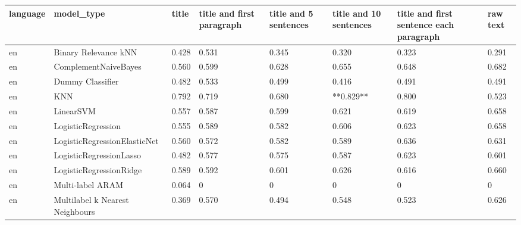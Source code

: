 \begin{tabular}{llllllll}
\toprule
language &                      model\_type & title & title and first paragraph & title and 5 sentences & title and 10 sentences & title and first sentence each paragraph &  raw text \\
\midrule
      en &            Binary Relevance kNN & 0.428 &                     0.531 &                 0.345 &                  0.320 &                                   0.323 &     0.291 \\
      en &            ComplementNaiveBayes & 0.560 &                     0.599 &                 0.628 &                  0.655 &                                   0.648 &     0.682 \\
      en &                Dummy Classifier & 0.482 &                     0.533 &                 0.499 &                  0.416 &                                   0.491 &     0.491 \\
      en &                             KNN & 0.792 &                     0.719 &                 0.680 &              **0.829** &                                   0.800 &     0.523 \\
      en &                       LinearSVM & 0.557 &                     0.587 &                 0.599 &                  0.621 &                                   0.619 &     0.658 \\
      en &              LogisticRegression & 0.555 &                     0.589 &                 0.582 &                  0.606 &                                   0.623 &     0.658 \\
      en &    LogisticRegressionElasticNet & 0.560 &                     0.572 &                 0.582 &                  0.589 &                                   0.636 &     0.631 \\
      en &         LogisticRegressionLasso & 0.482 &                     0.577 &                 0.575 &                  0.587 &                                   0.623 &     0.601 \\
      en &         LogisticRegressionRidge & 0.589 &                     0.592 &                 0.601 &                  0.626 &                                   0.616 &     0.660 \\
      en &                Multi-label ARAM & 0.064 &                         0 &                     0 &                      0 &                                       0 &         0 \\
      en & Multilabel k Nearest Neighbours & 0.369 &                     0.570 &                 0.494 &                  0.548 &                                   0.523 &     0.626 \\

\end{tabular}
